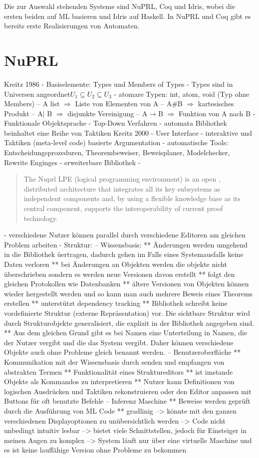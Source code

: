 Die zur Auswahl stehenden Systeme sind NuPRL, Coq und Idris, wobei die ersten beiden auf ML basieren und Idris auf Haskell. In NuPRL und Coq gibt es bereits erste Realisierungen von Automaten.
\section{NuPRL}
Kreitz 1986
- Basiselemente: Types und Members of Types
- Types sind in Universen angeordnet$U_1\subseteq U_2\subseteq U_3$
- atomare Typen: int, atom, void (Typ ohne Members)
-- A list $\Rightarrow$ Liste von Elementen von A
-- A\#B $\Rightarrow$ kartesisches Produkt
-- A$\vert$ B $\Rightarrow$ disjunkte Vereinigung
-- A$\rightarrow$B $\Rightarrow$ Funktion von A nach B
- Funktionale Objektsprache
- Top-Down Verfahren
- automata Bibliothek beinhaltet eine Reihe von Taktiken
Kreitz 2000
- User Interface
- interaktive und Taktiken (meta-level code) basierte Argumentation
- automatische Tools: Entscheidungsprozeduren, Theorembeweiser, Beweisplaner, Modelchecker, Rewrite Enginges
- erweiterbare Bibliothek
- \begin{quotation}
   The Nuprl LPE (logical programming environment) is an open , distributed architecture that integrates all its key subsystems as independent components and, by using a flexible knowledge base as its central component, supports the interoperability of current proof technology.
  \end{quotation}
- verschiedene Nutzer k\"onnen parallel durch verschiedene Editoren am gleichen Problem arbeiten
- Struktur:
-- Wissensbasis:
** \"Anderungen werden umgehend in die Bibliothek \"uertragen, dadurch gehen im Falls eines Systemausfalls keine Daten verloren
** bei \"Anderungen an Objekten werden die objekte nicht \"uberschrieben sondern es werden neue Versionen davon erstellt
** folgt den gleichen Protokollen wie Datenbanken
** \"altere Versionen von Objekten k\"onnen wieder hergestellt werden und so kann man auch mehrere Beweis eines Theorems erstellen
** unterst\"utzt dependency tracking
** Bibliothek schreibt keine vordefinierte Struktur (externe Repr\"asentation) vor. Die sichtbare Struktur wird durch Strukturobjekte generalisiert, die explizit in der Bibliothek angegeben sind.
** Aus dem gleichen Grund gibt es bei Namen eine Unterteilung in Namen, die der Nutzer vergibt und die das System vergibt. Daher k\"onnen verschiedene Objekte auch ohne Probleme gleich benannt werden.
-- Benutzeroberfl\"ache
** Kommunikation mit der Wissensbasis durch senden und empfangen von abstrakten Termen
** Funktionalit\"at eines Struktureditors
** ist imstande Objekte als Kommandos zu interpretieren
** Nutzer kann Definitionen von logischen Ausdr\"ucken und Taktiken rekonstruieren oder den Editor anpassen mit Buttons f\"ur oft benutzte Befehle
-- Inferenz Maschine
** Beweise werden gepr\"uft durch die Ausf\"uhrung von ML Code
** gradlinig
--> k\"onnte mit den ganzen verschiedenen Displayoptionen zu un\"ubersichtlich werden
--> Code nicht unbedingt intuitiv lesbar
--> bietet viele Schnittstellen, jedoch f\"ur Einsteiger in meinen Augen zu komplex
--> System l\"auft nur \"uber eine virtuelle Maschine und es ist keine lauff\"ahige Version ohne Probleme zu bekommen

